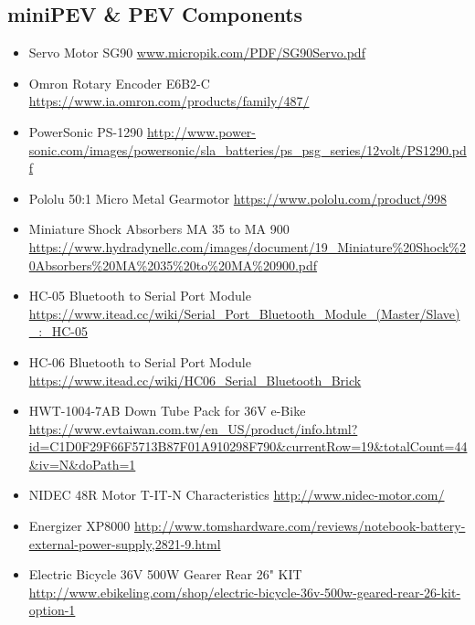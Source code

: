 \subsection{miniPEV \& PEV Components}
\begin{itemize}
	\begin{itemize} \itemsep -10pt
	\item Servo Motor SG90 \url{www.micropik.com/PDF/SG90Servo.pdf}
	\item Omron Rotary Encoder E6B2-C \url{https://www.ia.omron.com/products/family/487/}
	\item PowerSonic PS-1290 \url{http://www.power-sonic.com/images/powersonic/sla_batteries/ps_psg_series/12volt/PS1290.pdf}
	\item Pololu 50:1 Micro Metal Gearmotor \url{https://www.pololu.com/product/998}
	\item Miniature Shock Absorbers MA 35 to MA 900 \url{https://www.hydradynellc.com/images/document/19_Miniature%20Shock%20Absorbers%20MA%2035%20to%20MA%20900.pdf}
	\item HC-05 Bluetooth to Serial Port Module \url{https://www.itead.cc/wiki/Serial_Port_Bluetooth_Module_(Master/Slave)_:_HC-05}
	\item HC-06 Bluetooth to Serial Port Module \url{https://www.itead.cc/wiki/HC06_Serial_Bluetooth_Brick}
	\item HWT-1004-7AB Down Tube Pack for 36V e-Bike \url{https://www.evtaiwan.com.tw/en_US/product/info.html?id=C1D0F29F66F5713B87F01A910298F790&currentRow=19&totalCount=44&iv=N&doPath=1}
	\item NIDEC 48R Motor T-IT-N Characteristics \url{http://www.nidec-motor.com/}
	\item Energizer XP8000 \url{http://www.tomshardware.com/reviews/notebook-battery-external-power-supply,2821-9.html}
	\item Electric Bicycle 36V 500W Gearer Rear 26" KIT \url{http://www.ebikeling.com/shop/electric-bicycle-36v-500w-geared-rear-26-kit-option-1}
	\end{itemize}
\end{itemize}

